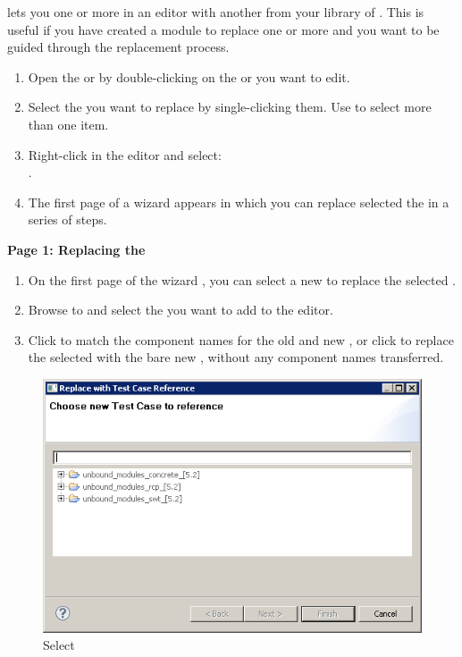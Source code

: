 
\app{} lets you  one or more \gdcases{} in an editor with another \gdcase{} from your library of \gdcases{}. This is useful if you have created a module to replace one or more \gdcases{} and you want to be guided through the replacement process.

\begin{enumerate}
\item Open the \gdtestcaseeditor{} or \gdtestsuiteeditor{} by double-clicking on the \gdcase{} or \gdsuite{} you  want to edit. 
\item Select the \gdcases{} you want to replace by single-clicking them. Use 
   to select more than one item. 
\item Right-click in the editor and  select: \\
.
\item The first page of a wizard appears in which you can replace selected the \gdcases{} in a series of steps. 
\end{enumerate}



\textbf{Page 1: Replacing the \gdcases{}}
\begin{enumerate}
\item On the first page of the wizard , you can select a  new  \gdcase{} to replace the selected \gdcases{}. 
\item Browse to and select the \gdcase{} you want to add to the editor.
\item Click  to match the component names for the old and new \gdcases{}, or click  to replace the selected \gdcases{} with the bare new \gdcase{}, without any component names transferred. 
\end{enumerate}

\begin{figure}[h]
\begin{center}
\includegraphics[width=12.5cm]{Tasks/Editors/PS/ReplaceTC_ChooseTC}
\caption{Select \gdcase{}}
\label{ReplaceTC-ChooseTC}
\end{center}
\end{figure} 


